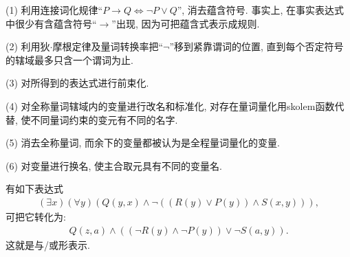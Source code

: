 (1) 利用连接词化规律“$P\rightarrow Q\Leftrightarrow \neg P\vee Q$”, 消去蕴含符号. 事实上, 在事实表达式中很少有含蕴含符号“$\rightarrow$”出现, 因为可把蕴含式表示成规则.

(2) 利用狄$\cdot$摩根定律及量词转换率把“$\neg$”移到紧靠谓词的位置, 直到每个否定符号的辖域最多只含一个谓词为止.

(3) 对所得到的表达式进行前束化.

(4) 对全称量词辖域内的变量进行改名和标准化, 对存在量词量化用skolem函数代替, 使不同量词约束的变元有不同的名字.

(5) 消去全称量词, 而余下的变量都被认为是全程量词量化的变量.

(6) 对变量进行换名, 使主合取元具有不同的变量名.
\begin{example}
有如下表达式
\begin{align}
  (\exists  x) (\forall y)(Q(y, x)\wedge \neg ((R(y)\vee P(y))\wedge S(x, y))),
\end{align}
可把它转化为:
\begin{align}
  Q(z, a)\wedge ((\neg R(y)\wedge \neg P(y))\vee \neg S(a, y)).
\end{align}
这就是与/或形表示.
\end{example}
